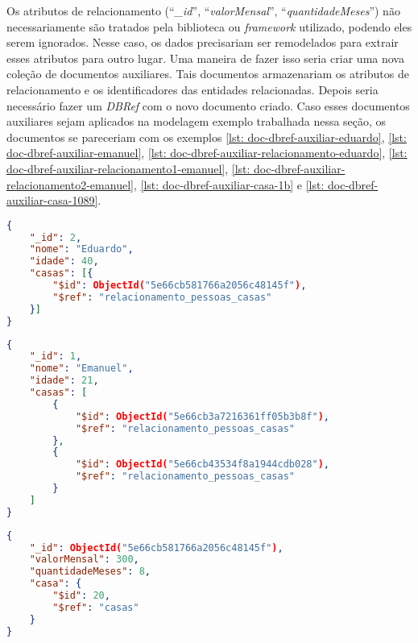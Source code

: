 Os atributos de relacionamento (``\textit{\_id}'', ``\textit{valorMensal}'', ``\textit{quantidadeMeses}'') não necessariamente são tratados pela biblioteca ou \textit{framework} utilizado, podendo eles serem ignorados. Nesse caso, os dados precisariam ser remodelados para extrair esses atributos para outro lugar. Uma maneira de fazer isso seria criar uma nova coleção de documentos auxiliares. Tais documentos armazenariam os atributos de relacionamento e os identificadores das entidades relacionadas. Depois seria necessário fazer um \textit{DBRef} com o novo documento criado. Caso esses documentos auxiliares sejam aplicados na modelagem exemplo trabalhada nessa seção, os documentos se pareceriam com os exemplos \ref{lst: doc-dbref-auxiliar-eduardo}, \ref{lst: doc-dbref-auxiliar-emanuel}, \ref{lst: doc-dbref-auxiliar-relacionamento-eduardo}, \ref{lst: doc-dbref-auxiliar-relacionamento1-emanuel}, \ref{lst: doc-dbref-auxiliar-relacionamento2-emanuel}, \ref{lst: doc-dbref-auxiliar-casa-1b} e \ref{lst: doc-dbref-auxiliar-casa-1089}.

\begin{lstlisting}[language=json, caption={Documento de \textit{Eduardo} Usando Documento Auxiliar\label{lst: doc-dbref-auxiliar-eduardo}}]
{
    "_id": 2,
    "nome": "Eduardo",
    "idade": 40,
    "casas": [{
        "$id": ObjectId("5e66cb581766a2056c48145f"),
        "$ref": "relacionamento_pessoas_casas"
    }]
}
\end{lstlisting}

\begin{lstlisting}[language=json, caption={Documento de \textit{Emanuel} Usando Documento Auxiliar\label{lst: doc-dbref-auxiliar-emanuel}}]
{
    "_id": 1,
    "nome": "Emanuel",
    "idade": 21,
    "casas": [
        {
            "$id": ObjectId("5e66cb3a7216361ff05b3b8f"),
            "$ref": "relacionamento_pessoas_casas"
        },
        {
            "$id": ObjectId("5e66cb43534f8a1944cdb028"),
            "$ref": "relacionamento_pessoas_casas"
        }
    ]
}
\end{lstlisting}


\begin{lstlisting}[language=json, caption={Relacionamento de \textit{Eduardo} com sua Casa \label{lst: doc-dbref-auxiliar-relacionamento-eduardo}}]
{
    "_id": ObjectId("5e66cb581766a2056c48145f"),
    "valorMensal": 300,
    "quantidadeMeses": 8,
    "casa": {
        "$id": 20,
        "$ref": "casas"
    }
}
\end{lstlisting}

